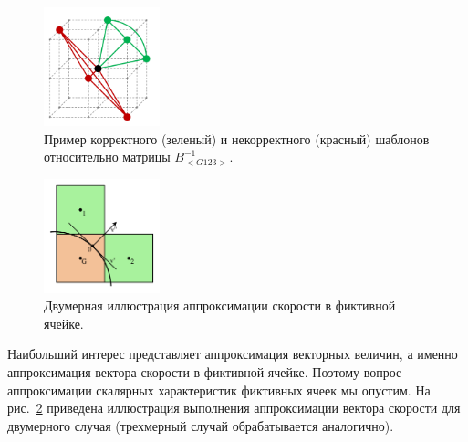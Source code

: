 \begin{figure}[ht]
\centering
\includegraphics[width=0.3\textwidth]{./pics/text_1_immersed_boundary_method/template.pdf}
\singlespacing
{}\caption{Пример корректного (зеленый) и некорректного (красный) шаблонов относительно матрицы $B_{<G123>}^{-1}$.}
\label{fig:text_1_immersed_boundary_method_template}
\end{figure}

\begin{figure}[ht]
\centering
\includegraphics[width=0.3\textwidth]{./pics/text_1_immersed_boundary_method/3_points_lin_appr_velocity_2d.pdf}
\singlespacing
{}\caption{Двумерная иллюстрация аппроксимации скорости в фиктивной ячейке.}
\label{fig:text_1_immersed_boundary_method_2}
\end{figure}

Наибольший интерес представляет аппроксимация векторных величин, а именно аппроксимация вектора скорости в фиктивной ячейке.
Поэтому вопрос аппроксимации скалярных характеристик фиктивных ячеек мы опустим.
На рис.~\ref{fig:text_1_immersed_boundary_method_2} приведена иллюстрация выполнения аппроксимации вектора скорости для двумерного случая (трехмерный случай обрабатывается аналогично).


